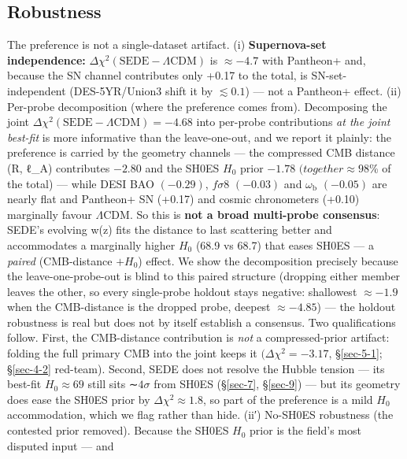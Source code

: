 \documentclass[preprint,12pt]{elsarticle}
\begin{document}
\subsection{Robustness}\label{sec-5-4}

The preference is not a single-dataset artifact. (i)
\textbf{Supernova-set independence:}
\(\Delta \chi ^{2}(\mathrm{SEDE} - \Lambda \mathrm{CDM})\) is
\(\approx  -4.7\) with Pantheon+ and, because the SN channel contributes
only +0.17 to the total, is SN-set-independent (DES-5YR/Union3 shift it
by \(\lesssim 0.1\)) --- not a Pantheon+ effect. (ii) Per-probe
decomposition (where the preference comes from). Decomposing the joint
\(\Delta \chi ^{2}(\mathrm{SEDE} - \Lambda \mathrm{CDM}) = -4.68\) into
per-probe contributions \emph{at the joint best-fit} is more informative
than the leave-one-out, and we report it plainly: the preference is
carried by the geometry channels --- the compressed CMB distance (R,
ℓ\_A) contributes \(-2.80\) and the SH0ES \(H_{0}\) prior \(-1.78\)
\((together \approx  98\)\% of the total) --- while DESI BAO
\((-0.29)\), \(f\sigma 8\) \((-0.03)\) and \(\omega _{\mathrm{b}}\)
\((-0.05)\) are nearly flat and Pantheon+ SN (+0.17) and cosmic
chronometers (+0.10) marginally favour \(\Lambda \mathrm{CDM}\). So this
is \textbf{not a broad multi-probe consensus}: SEDE's evolving w(z) fits
the distance to last scattering better and accommodates a marginally
higher \(H_{0}\) (68.9 vs 68.7) that eases SH0ES --- a \emph{paired}
(CMB-distance \(+ H_{0}\)) effect. We show the decomposition precisely
because the leave-one-probe-out is blind to this paired structure
(dropping either member leaves the other, so every single-probe holdout
stays negative: shallowest \(\approx  -1.9\) when the CMB-distance is
the dropped probe, deepest \(\approx  -4.85\)) --- the holdout
robustness is real but does not by itself establish a consensus. Two
qualifications follow. First, the CMB-distance contribution is
\emph{not} a compressed-prior artifact: folding the full primary CMB
into the joint keeps it \((\Delta \chi ^{2} = -3.17\), §\ref{sec-5-1};
§\ref{sec-4-2} red-team). Second, SEDE does not resolve the Hubble
tension --- its best-fit \(H_{0} \approx  69\) still sits ∼\(4\sigma\)
from SH0ES (§\ref{sec-7}, §\ref{sec-9}) --- but its geometry does ease
the SH0ES prior by \(\Delta \chi ^{2} \approx  1.8\), so part of the
preference is a mild \(H_{0}\) accommodation, which we flag rather than
hide. (ii′) No-SH0ES robustness (the contested prior removed). Because
the SH0ES \(H_{0}\) prior is the field's most disputed input --- and
\end{document}
